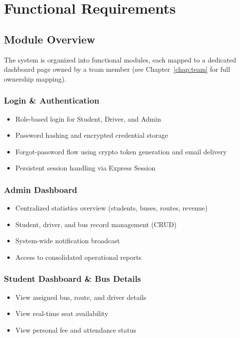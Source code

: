 \documentclass[11pt,a4paper]{report}
\begin{document}
\chapter{Functional Requirements}

\section{Module Overview}
The system is organized into functional modules, each mapped to a dedicated dashboard page owned by a team member (see Chapter~\ref{chap:team} for full ownership mapping).

\subsection{Login \& Authentication}
\begin{itemize}[leftmargin=1.3em]
  \item Role-based login for Student, Driver, and Admin
  \item Password hashing and encrypted credential storage
  \item Forgot-password flow using crypto token generation and email delivery
  \item Persistent session handling via Express Session
\end{itemize}

\subsection{Admin Dashboard}
\begin{itemize}[leftmargin=1.3em]
  \item Centralized statistics overview (students, buses, routes, revenue)
  \item Student, driver, and bus record management (CRUD)
  \item System-wide notification broadcast
  \item Access to consolidated operational reports
\end{itemize}

\subsection{Student Dashboard \& Bus Details}
\begin{itemize}[leftmargin=1.3em]
  \item View assigned bus, route, and driver details
  \item View real-time seat availability
  \item View personal fee and attendance status
\end{itemize}
\end{document}
